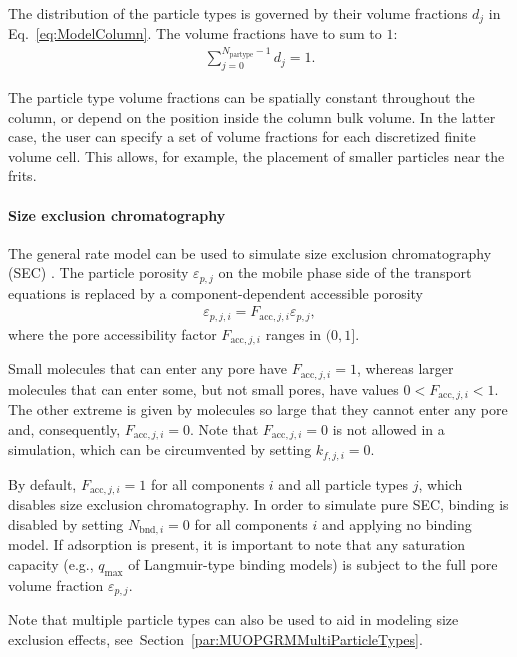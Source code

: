 The distribution of the particle types is governed by their volume fractions $d_j$ in Eq.~\eqref{eq:ModelColumn}.
The volume fractions have to sum to $1$:
\begin{align*}
	\sum_{j=0}^{N_{\text{partype}} - 1} d_j = 1.
\end{align*}

The particle type volume fractions can be spatially constant throughout the column, or depend on the position inside the column bulk volume.
In the latter case, the user can specify a set of volume fractions for each discretized finite volume cell.
This allows, for example, the placement of smaller particles near the frits.

\paragraph{Size exclusion chromatography}
\label{par:MUOPGRMSizeExclusion}

The general rate model can be used to simulate size exclusion chromatography (SEC) \cite{Gu1995}. 
The particle porosity $\varepsilon_{p,j}$ on the mobile phase side of the transport equations is replaced by a component-dependent accessible porosity
\begin{align}
	\varepsilon_{p,j,i} = F_{\text{acc},j,i} \varepsilon_{p,j},
\end{align}
where the pore accessibility factor $F_{\text{acc},j,i}$ ranges in $(0, 1]$.

Small molecules that can enter any pore have $F_{\text{acc},j,i} = 1$, whereas larger molecules that can enter some, but not small pores, have values $0 < F_{\text{acc},j,i} < 1$.
The other extreme is given by molecules so large that they cannot enter any pore and, consequently, $F_{\text{acc},j,i} = 0$.
Note that $F_{\text{acc},j,i} = 0$ is not allowed in a simulation, which can be circumvented by setting $k_{f,j,i} = 0$.

By default, $F_{\text{acc},j,i} = 1$ for all components $i$ and all particle types $j$, which disables size exclusion chromatography.
In order to simulate pure SEC, binding is disabled by setting $N_{\text{bnd},i} = 0$ for all components $i$ and applying no binding model.
If adsorption is present, it is important to note that any saturation capacity (e.g., $q_{\text{max}}$ of Langmuir-type binding models) is subject to the full pore volume fraction $\varepsilon_{p,j}$.

Note that multiple particle types can also be used to aid in modeling size exclusion effects, see~Section~\ref{par:MUOPGRMMultiParticleTypes}.

